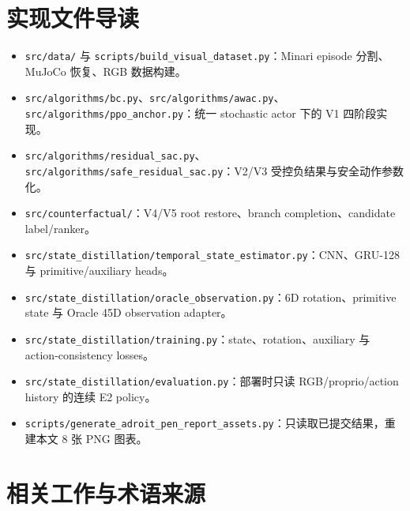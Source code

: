 \hypertarget{ux5b9eux73b0ux6587ux4ef6ux5bfcux8bfb}{%
\section{实现文件导读}\label{ux5b9eux73b0ux6587ux4ef6ux5bfcux8bfb}}

\begin{itemize}
\tightlist
\item
  \texttt{src/data/} 与 \texttt{scripts/build\_visual\_dataset.py}：Minari episode 分割、MuJoCo 恢复、RGB 数据构建。
\item
  \texttt{src/algorithms/bc.py}、\texttt{src/algorithms/awac.py}、\texttt{src/algorithms/ppo\_anchor.py}：统一 stochastic actor 下的 V1 四阶段实现。
\item
  \texttt{src/algorithms/residual\_sac.py}、\nolinkurl{src/algorithms/safe_residual_sac.py}：V2/V3 受控负结果与安全动作参数化。
\item
  \texttt{src/counterfactual/}：V4/V5 root restore、branch completion、candidate label/ranker。
\item
  \nolinkurl{src/state_distillation/temporal_state_estimator.py}：CNN、GRU-128 与 primitive/auxiliary heads。
\item
  \nolinkurl{src/state_distillation/oracle_observation.py}：6D rotation、primitive state 与 Oracle 45D observation adapter。
\item
  \nolinkurl{src/state_distillation/training.py}：state、rotation、auxiliary 与 action-consistency losses。
\item
  \nolinkurl{src/state_distillation/evaluation.py}：部署时只读 RGB/proprio/action history 的连续 E2 policy。
\item
  \nolinkurl{scripts/generate_adroit_pen_report_assets.py}：只读取已提交结果，重建本文 8 张 PNG 图表。
\end{itemize}

\hypertarget{ux76f8ux5173ux5de5ux4f5cux4e0eux672fux8bedux6765ux6e90}{%
\section{相关工作与术语来源}\label{ux76f8ux5173ux5de5ux4f5cux4e0eux672fux8bedux6765ux6e90}}

